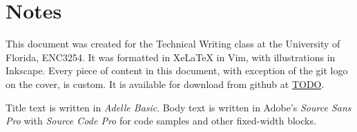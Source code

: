\documentclass[11pt,letterpaper,twoside]{report}
\begin{document}
\chapter*{Notes}
\pagestyle{empty}
\thispagestyle{empty}

This document was created for the Technical Writing class at the University of
Florida, ENC3254. It was formatted in XeLaTeX in Vim, with illustrations in
Inkscape. Every piece of content in this document, with exception of the git
logo on the cover, is custom. It is available for download from github at
\url{TODO}.

Title text is written in \emph{Adelle Basic}. Body text is written in Adobe's
\emph{Source Sans Pro} with \emph{Source Code Pro} for code samples and other
fixed-width blocks.


\patchcmd{\thebibliography}{\chapter*}{\section*}{}{}

\end{document}
